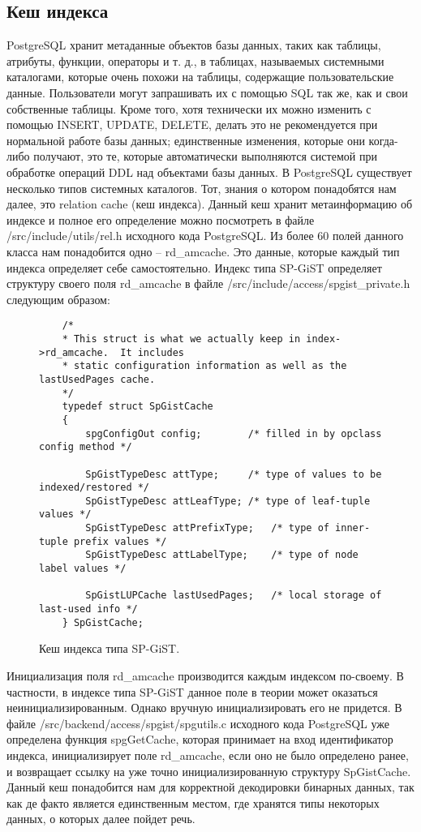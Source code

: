 \documentclass[12pt,oneside]{amsart}
\begin{document}
\subsection{Кеш индекса}

PostgreSQL хранит метаданные объектов базы данных, таких как таблицы, атрибуты, функции, операторы и т. д., в таблицах, называемых системными каталогами, которые очень похожи на таблицы, содержащие пользовательские данные. Пользователи могут запрашивать их с помощью SQL так же, как и свои собственные таблицы. Кроме того, хотя технически их можно изменить с помощью INSERT, UPDATE, DELETE, делать это не рекомендуется при нормальной работе базы данных; единственные изменения, которые они когда-либо получают, это те, которые автоматически выполняются системой при обработке операций DDL над объектами базы данных. В PostgreSQL существует несколько типов системных каталогов. Тот, знания о котором понадобятся нам далее, это relation cache (кеш индекса). Данный кеш хранит метаинформацию об индексе и полное его определение можно посмотреть в файле /src/include/utils/rel.h исходного кода PostgreSQL. Из более 60 полей данного класса нам понадобится одно -- rd\_amcache. Это данные, которые каждый тип индекса определяет себе самостоятельно. Индекс типа SP-GiST определяет структуру своего поля rd\_amcache в файле /src/include/access/spgist\_private.h следующим образом:

\begin{figure}[ht!]
\begin{lstlisting}
	/*
	* This struct is what we actually keep in index->rd_amcache.  It includes
	* static configuration information as well as the lastUsedPages cache.
	*/
	typedef struct SpGistCache
	{
		spgConfigOut config;		/* filled in by opclass config method */

		SpGistTypeDesc attType;		/* type of values to be indexed/restored */
		SpGistTypeDesc attLeafType; /* type of leaf-tuple values */
		SpGistTypeDesc attPrefixType;	/* type of inner-tuple prefix values */
		SpGistTypeDesc attLabelType;	/* type of node label values */

		SpGistLUPCache lastUsedPages;	/* local storage of last-used info */
	} SpGistCache;
\end{lstlisting}
\caption{Кеш индекса типа SP-GiST.}\label{spCache}
\end{figure}

Инициализация поля rd\_amcache производится каждым индексом по-своему. В частности, в индексе типа SP-GiST данное поле в теории может оказаться неинициализированным. Однако вручную инициализировать его не придется. В файле /src/backend/access/spgist/spgutils.c исходного кода PostgreSQL уже определена функция spgGetCache, которая принимает на вход идентификатор индекса, инициализирует поле rd\_amcache, если оно не было определено ранее, и возвращает ссылку на уже точно инициализированную структуру SpGistCache. Данный кеш понадобится нам для корректной декодировки бинарных данных, так как де факто является единственным местом, где хранятся типы некоторых данных, о которых далее пойдет речь.
\end{document}
